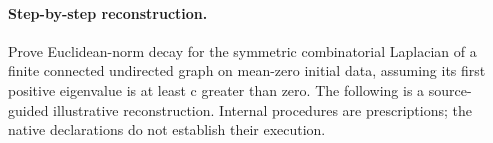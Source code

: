 %
%
%
\paragraph{Step-by-step reconstruction.}
Prove Euclidean-norm decay for the symmetric combinatorial Laplacian of a finite connected undirected graph on mean-zero initial data, assuming its first positive eigenvalue is at least c greater than zero.
The following is a source-guided illustrative reconstruction. Internal procedures are prescriptions; the native declarations do not establish their execution.

